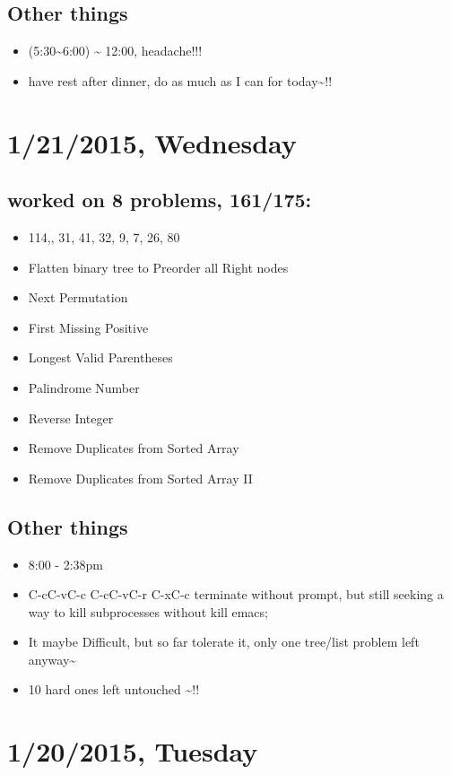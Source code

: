 \documentclass[9pt,b5paper]{article}
\begin{document}
\subsection{Other things}
\label{sec-4-2}
\begin{itemize}
\item (5:30\textasciitilde{}6:00) \textasciitilde{} 12:00, headache!!!
\item have rest after dinner, do as much as I can for today\textasciitilde{}!!
\end{itemize}
\section{1/21/2015, Wednesday}
\label{sec-5}
\subsection{worked on 8 problems, 161/175:}
\label{sec-5-1}
\begin{itemize}
\item 114,, 31, 41, 32, 9, 7, 26, 80
\item Flatten binary tree to Preorder all Right nodes
\item Next Permutation
\item First Missing Positive
\item Longest Valid Parentheses
\item Palindrome Number
\item Reverse Integer
\item Remove Duplicates from Sorted Array
\item Remove Duplicates from Sorted Array II
\end{itemize}
\subsection{Other things}
\label{sec-5-2}
\begin{itemize}
\item 8:00 - 2:38pm
\item C-cC-vC-c C-cC-vC-r C-xC-c terminate without prompt, but still seeking a way to kill subprocesses without kill emacs;
\item It maybe Difficult, but so far tolerate it, only one tree/list problem left anyway\textasciitilde{}
\item 10 hard ones left untouched \textasciitilde{}!!
\end{itemize}
\section{1/20/2015, Tuesday}
\label{sec-6}
\end{document}
